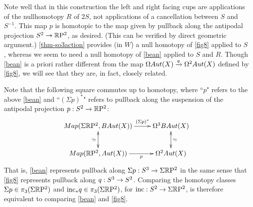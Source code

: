 \documentclass{amsart}
\begin{document}
Note well that in this construction the left and right facing cups are applications of the nullhomotopy $R$ of $2S$, not applications of a cancellation between $S$ and $S^{-1}$.  This map $p$ is homotopic to the map given by pullback along the antipodal projection $S^2 \rightarrow \mathbb R \mathrm{P}^2$, as desired.  (This can be verified by direct geometric argument.)  \cref{thm-so3action} provides (in $W$) a null homotopy of \cref{fig8} applied to $S$, whereas we seem to need a null homotopy of \cref{bean} applied to $S$ and $R$.  Though \cref{bean} is a priori rather different from the map $\Omega Aut(X) \xrightarrow{q} \Omega^2 Aut(X)$ defined by \cref{fig8}, we will see that they are, in fact, closely related.

Note that the following square commutes up to homotopy, where ``$p$" refers to the above \cref{bean} and ``$(\Sigma p)^\ast$" refers to pullback along the suspension of the antipodal projection $p: S^2 \rightarrow \mathbb R \mathrm{P}^2$:
\[
\xymatrix{
\Map(\Sigma\RP^2,B\Aut(X)) \ar[r]^-{(\Sigma p)^\ast} \ar@{<->}[d]_{\simeq} & \Omega^3 B\Aut(X)  \ar@{<->}[d]^{\simeq} \\
\Map(\RP^2,\Aut(X)) \ar[r]_-{p} & \Omega^2 \Aut(X)
}
\]
That is, \cref{bean} represents pullback along $\Sigma p: S^3 \rightarrow \Sigma \mathbb R \mathrm{P}^2$ in the same sense that \cref{fig8} represents pullback along $q: S^3 \rightarrow S^2$.  Comparing the homotopy classes $\Sigma p \in \pi_3(\Sigma \mathbb R \mathrm{P}^2)$ and $\mathrm{inc}_* q \in \pi_3(\Sigma \mathbb R \mathrm{P}^2)$, for $\mathrm{inc}: S^2 \rightarrow \Sigma \mathbb R \mathrm{P}^2$, is therefore equivalent to comparing \cref{bean} and \cref{fig8}.  
\end{document}
